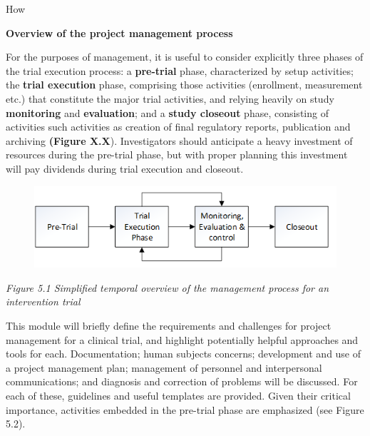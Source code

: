 \documentclass[]{book}
\begin{document}
How

\textbf{Overview of the project management process }

For the purposes of management, it is useful to consider explicitly
three phases of the trial execution process: a \textbf{pre-trial} phase,
characterized by setup activities; the \textbf{trial execution} phase,
comprising those activities (enrollment, measurement etc.) that
constitute the major trial activities, and relying heavily on study
\textbf{monitoring} and \textbf{evaluation}; and a \textbf{study
closeout} phase, consisting of activities such activities as creation of
final regulatory reports, publication and archiving \textbf{(Figure
X.X}). Investigators should anticipate a heavy investment of resources
during the pre-trial phase, but with proper planning this investment
will pay dividends during trial execution and closeout.

\begin{figure}[htbp]
\centering
\includegraphics{images/book/pm1.png}
\caption{}
\end{figure}

\emph{Figure 5.1 Simplified temporal overview of the management process
for an intervention trial }

This module will briefly define the requirements and challenges for
project management for a clinical trial, and highlight potentially
helpful approaches and tools for each. Documentation; human subjects
concerns; development and use of a project management plan; management
of personnel and interpersonal communications; and diagnosis and
correction of problems will be discussed. For each of these, guidelines
and useful templates are provided. Given their critical importance,
activities embedded in the pre-trial phase are emphasized (see Figure
5.2).
\end{document}
